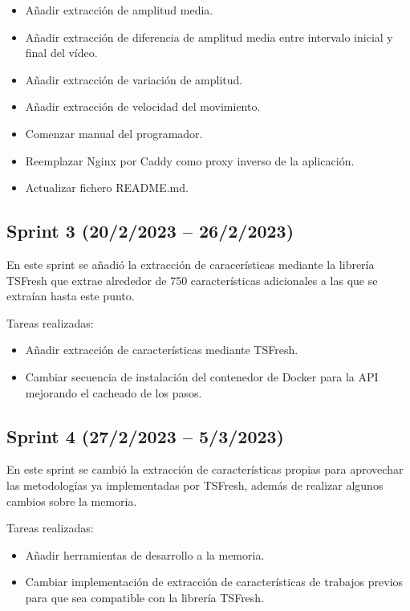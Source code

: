 \begin{itemize}
    \item Añadir extracción de amplitud media.
    \item Añadir extracción de diferencia de amplitud media entre intervalo
          inicial y final del vídeo.
    \item Añadir extracción de variación de amplitud.
    \item Añadir extracción de velocidad del movimiento.
    \item Comenzar manual del programador.
    \item Reemplazar Nginx por Caddy como proxy inverso de la aplicación.
    \item Actualizar fichero README.md.
\end{itemize}

\subsection{Sprint 3 (20/2/2023 -- 26/2/2023)}

En este sprint se añadió la extracción de caracerísticas mediante la librería
TSFresh que extrae alrededor de 750 características adicionales a las que se
extraían hasta este punto.

Tareas realizadas:

\begin{itemize}
    \item Añadir extracción de características mediante TSFresh.
    \item Cambiar secuencia de instalación del contenedor de Docker para la API
          mejorando el cacheado de los pasos.
\end{itemize}

\subsection{Sprint 4 (27/2/2023 -- 5/3/2023)}

En este sprint se cambió la extracción de características propias para
aprovechar las metodologías ya implementadas por TSFresh, además de realizar
algunos cambios sobre la memoria.

Tareas realizadas:

\begin{itemize}
    \item Añadir herramientas de desarrollo a la memoria.
    \item Cambiar implementación de extracción de características de trabajos
          previos para que sea compatible con la librería TSFresh.
\end{itemize}

